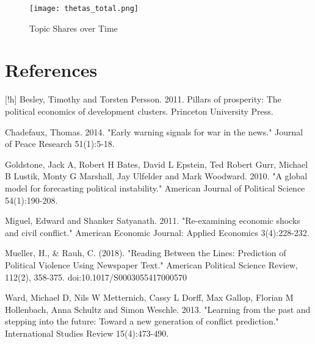 \begin{appendix}
    \clearpage
    \newpage

    \begin{figure}[!h]
        \centering
        \texttt{[image: thetas\_total.png]}
        \caption{Topic Shares over Time}
        \label{tstopics}
    \end{figure}

\end{appendix}

\clearpage

\newpage

\section*{References}[!h]
Besley, Timothy and Torsten Persson. 2011. Pillars of prosperity: The political economics \newline \indent of development clusters. Princeton University Press.\vspace{0.25cm}

\noindent Chadefaux, Thomas. 2014. "Early warning signals for war in the news." Journal of Peace \newline \indent Research 51(1):5-18.\vspace{0.25cm}

\noindent Goldstone, Jack A, Robert H Bates, David L Epstein, Ted Robert Gurr, Michael B Lustik, \newline \indent Monty G Marshall, Jay Ulfelder and Mark Woodward. 2010. "A global model for \newline \indent forecasting political instability." American Journal of Political Science 54(1):190-208.\vspace{0.25cm}

\noindent Miguel, Edward and Shanker Satyanath. 2011. "Re-examining economic shocks and civil \newline \indent conflict." American Economic Journal: Applied Economics 3(4):228-232.\vspace{0.25cm}

\noindent Mueller, H., \& Rauh, C. (2018). "Reading Between the Lines: Prediction of Political \newline \indent Violence Using Newspaper Text." American Political Science Review, 112(2), 358-375. \newline \indent doi:10.1017/S0003055417000570\vspace{0.25cm}

\noindent Ward, Michael D, Nils W Metternich, Cassy L Dorff, Max Gallop, Florian M Hollenbach, \newline \indent Anna Schultz and Simon Weschle. 2013. "Learning from the past and stepping into \newline \indent the future: Toward a new generation of conflict prediction." International Studies \newline \indent Review 15(4):473-490.

\clearpage

